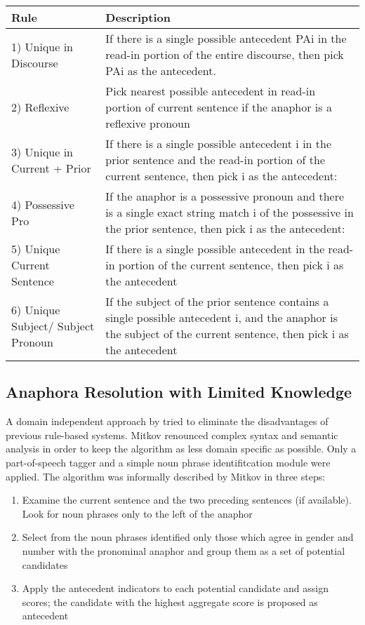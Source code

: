 \begin{center}
    \begin{tabular}{| l |p{8cm} |}

    \hline

    Rule & Description \\ \hline
\hline
    1) Unique in Discourse & If there is a single possible antecedent PAi in the read-in portion of the entire discourse, then pick PAi as the antecedent. \\ \hline
    2) Reflexive & Pick nearest possible antecedent in read-in portion of current sentence if the anaphor is a reflexive pronoun \\ \hline
    3) Unique in Current + Prior & If there is a single possible antecedent i in the prior sentence and the read-in portion of the current sentence, then pick i as the antecedent: \\ \hline
    4) Possessive Pro & If the anaphor is a possessive pronoun and there is a single exact string match i of the possessive in the prior sentence, then pick i as the antecedent:  \\ \hline
    5) Unique Current Sentence & If there is a single possible antecedent in the read-in portion of the current sentence, then pick i as the antecedent  \\ \hline
    6) Unique Subject/ Subject Pronoun & If the subject of the prior sentence contains a single possible antecedent i, and the anaphor is the subject of the current sentence, then pick i as the antecedent \\ \hline

    \end{tabular}
     \label{table:cogniacRules}
\end{center}

\subsection{Anaphora Resolution with Limited Knowledge}
\label{anaphoraLimitedKnowledgeSection}

A domain independent approach by \cite{mitkov1998robust} tried to eliminate the disadvantages of previous rule-based systems. Mitkov renounced complex syntax and semantic analysis in order to keep the algorithm as less domain specific as possible. Only a part-of-speech tagger and a simple noun phrase identifitcation module were applied. The algorithm was informally described by Mitkov in three steps:
\begin{enumerate} 
\item Examine the current sentence and the two preceding sentences (if available). Look for noun phrases only to the left of the anaphor
\item Select from the noun phrases identified only those which agree in gender and number with the pronominal anaphor and group them as a set of potential candidates
\item Apply the antecedent indicators to each potential candidate and assign scores; the candidate with the highest aggregate score is proposed as antecedent
\end{enumerate}


